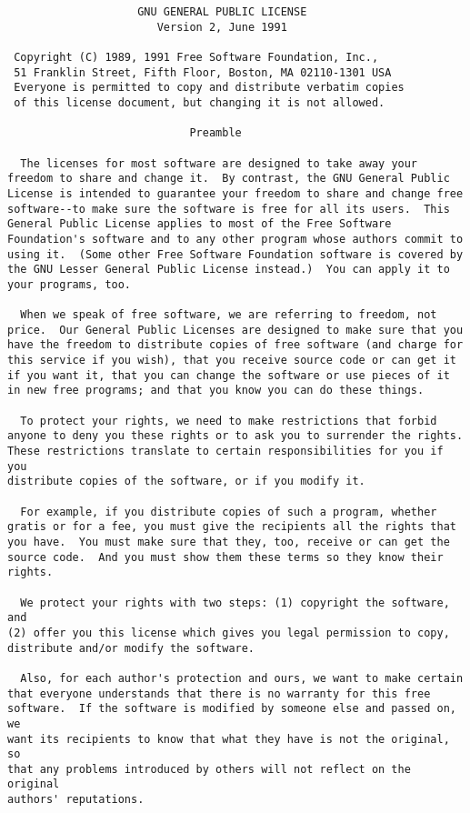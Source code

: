 \begin{verbatim}
                    GNU GENERAL PUBLIC LICENSE
                       Version 2, June 1991

 Copyright (C) 1989, 1991 Free Software Foundation, Inc.,
 51 Franklin Street, Fifth Floor, Boston, MA 02110-1301 USA
 Everyone is permitted to copy and distribute verbatim copies
 of this license document, but changing it is not allowed.

                            Preamble

  The licenses for most software are designed to take away your
freedom to share and change it.  By contrast, the GNU General Public
License is intended to guarantee your freedom to share and change free
software--to make sure the software is free for all its users.  This
General Public License applies to most of the Free Software
Foundation's software and to any other program whose authors commit to
using it.  (Some other Free Software Foundation software is covered by
the GNU Lesser General Public License instead.)  You can apply it to
your programs, too.

  When we speak of free software, we are referring to freedom, not
price.  Our General Public Licenses are designed to make sure that you
have the freedom to distribute copies of free software (and charge for
this service if you wish), that you receive source code or can get it
if you want it, that you can change the software or use pieces of it
in new free programs; and that you know you can do these things.

  To protect your rights, we need to make restrictions that forbid
anyone to deny you these rights or to ask you to surrender the rights.
These restrictions translate to certain responsibilities for you if you
distribute copies of the software, or if you modify it.

  For example, if you distribute copies of such a program, whether
gratis or for a fee, you must give the recipients all the rights that
you have.  You must make sure that they, too, receive or can get the
source code.  And you must show them these terms so they know their
rights.

  We protect your rights with two steps: (1) copyright the software, and
(2) offer you this license which gives you legal permission to copy,
distribute and/or modify the software.

  Also, for each author's protection and ours, we want to make certain
that everyone understands that there is no warranty for this free
software.  If the software is modified by someone else and passed on, we
want its recipients to know that what they have is not the original, so
that any problems introduced by others will not reflect on the original
authors' reputations.


\end{verbatim}
